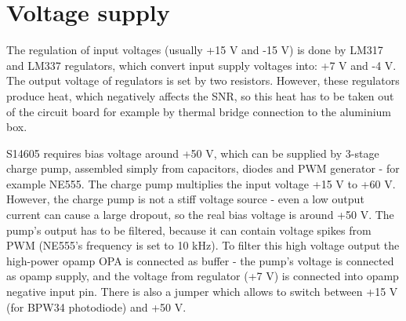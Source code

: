\par



\section{Voltage supply}
The regulation of input voltages (usually +15 V and -15 V) is done by LM317 and LM337 regulators, which convert input supply voltages into: +7 V and -4 V. The output voltage of regulators is set by two resistors. However, these regulators produce heat, which negatively affects the SNR, so this heat has to be taken out of the circuit board for example by thermal bridge connection to the aluminium box.

\par
S14605 requires bias voltage around +50 V, which can be supplied by 3-stage charge pump, assembled simply from capacitors, diodes and PWM generator - for example NE555. The charge pump multiplies the input voltage +15 V to +60 V. However, the charge pump is not a stiff voltage source - even a low output current can cause a large dropout, so the real bias voltage is around +50 V. The pump's output has to be filtered, because it can contain voltage spikes from PWM (NE555's frequency is set to 10 kHz). To filter this high voltage output the high-power opamp OPA is connected as buffer - the pump's voltage is connected as opamp supply, and the voltage from regulator (+7 V) is connected into opamp negative input pin. There is also a jumper which allows to switch between +15 V (for BPW34 photodiode) and +50 V.

\section{}



\section{}


